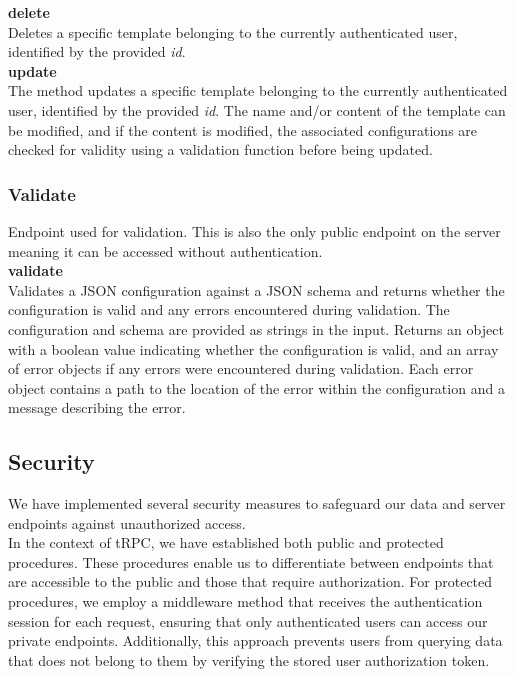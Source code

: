 \noindent
\textbf{delete} \\
Deletes a specific template belonging to the currently authenticated user, identified by the provided \textit{id}. \\

\noindent
\textbf{update} \\
The method updates a specific template belonging to the currently authenticated user, identified by the provided \textit{id}. The name and/or content of the template can be modified, and if the content is modified, the associated configurations are checked for validity using a validation function before being updated. \\

\subsubsection{Validate}

Endpoint used for validation. This is also the only public endpoint on the server meaning it can be accessed without authentication. \\

\noindent
\textbf{validate} \\
Validates a JSON configuration against a JSON schema and returns whether the configuration is valid and any errors encountered during validation. The configuration and schema are provided as strings in the input. Returns an object with a boolean value indicating whether the configuration is valid, and an array of error objects if any errors were encountered during validation. Each error object contains a path to the location of the error within the configuration and a message describing the error. \\

\subsection{Security}

We have implemented several security measures to safeguard our data and server endpoints against unauthorized access. \\

\noindent
In the context of tRPC, we have established both public and protected procedures. These procedures enable us to differentiate between endpoints that are accessible to the public and those that require authorization. For protected procedures, we employ a middleware method that receives the authentication session for each request, ensuring that only authenticated users can access our private endpoints. Additionally, this approach prevents users from querying data that does not belong to them by verifying the stored user authorization token. \\

